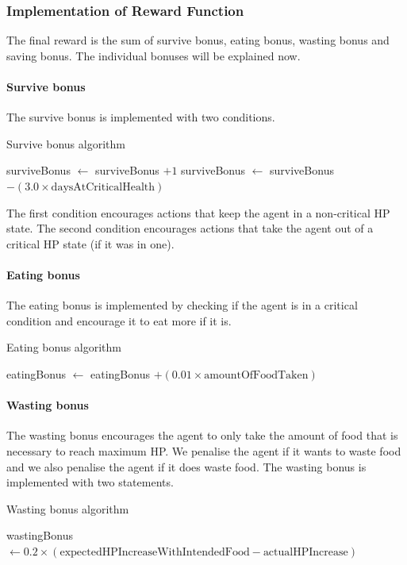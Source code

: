 \subsubsection{Implementation of Reward Function}
The final reward is the sum of survive bonus, eating bonus, wasting bonus and saving bonus. The individual bonuses will be explained now.
\paragraph{Survive bonus}
The survive bonus is implemented with two conditions.

\begin{algorithm}[H]
\caption{Survive bonus algorithm}
\label{survivebonus-algorithm}
 {
surviveBonus $\gets$ surviveBonus $+1$\;
}{
surviveBonus $\gets$ surviveBonus $-(3.0\times\textrm{daysAtCriticalHealth})$\;
}
\end{algorithm}

The first condition encourages actions that keep the agent in a non-critical HP state. The second condition encourages actions that take the agent out of a critical HP state (if it was in one).
\paragraph{Eating bonus}
The eating bonus is implemented by checking if the agent is in a critical condition and encourage it to eat more if it is.

\begin{algorithm}[H]
\caption{Eating bonus algorithm}
\label{eatingbonus-algorithm}
 {
eatingBonus $\gets$ eatingBonus $+(0.01\times\textrm{amountOfFoodTaken})$\;
}
\end{algorithm}

\paragraph{Wasting bonus}
The wasting bonus encourages the agent to only take the amount of food that is necessary to reach maximum HP. We penalise the agent if it wants to waste food and we also penalise the agent if it does waste food. The wasting bonus is implemented with two statements.

\begin{algorithm}[H]
\caption{Wasting bonus algorithm}
\label{wastingbonus-algorithm}
wastingBonus $\gets 0.2\times(\textrm{expectedHPIncreaseWithIntendedFood}-\textrm{actualHPIncrease})$ 
\end{algorithm}

